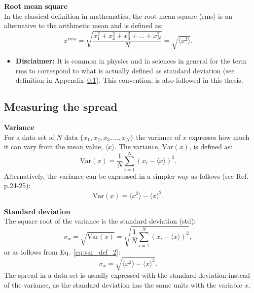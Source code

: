 \normalsize{\textbf{Root mean square}}\\
In the classical definition in mathematics, the root mean square (rms) is an alternative to the arithmetic mean and is defined as:
\begin{equation}\label{eq:rms_def}
    x^{rms} = \sqrt{\frac{x_1^2+x_2^2+x_3^2+...+x_N^2}{N}}=\sqrt{\langle x^2 \rangle}.
\end{equation}
\begin{itemize}
\item \textbf{Disclaimer:} It is common in physics and in sciences in general for the term rms to correspond to what is actually defined as standard deviation (see definition in Appendix~\ref{app:meas_spread}). This convention, is also followed in this thesis.
\end{itemize}
\subsection{Measuring the spread}\label{app:meas_spread}
\normalsize{\textbf{Variance}}\\
For a data set of $N$ data $\{ x_1, x_2, x_3, ..., x_N \}$ the variance of $x$  expresses how much it can vary from the mean value, $\langle x \rangle$. The variance, $\mathrm{Var}(x)$, is defined as:
\begin{equation}\label{eq:var_def_1}
    \mathrm{Var}(x) = \frac{1}{N} \sum_{i=1}^{N} (x_i-\langle x \rangle)^2.
\end{equation}
Alternatively, the variance can be expressed in a simpler way as follows (see Ref.~\cite{lvp.b313005720130101} p.24-25):
\begin{equation}\label{eq:var_def_2}
    \mathrm{Var}(x) = \langle x^2 \rangle - \langle x \rangle^2.
\end{equation}

\normalsize{\textbf{Standard deviation}}\\
The square root of the variance is the standard deviation (std):
\begin{equation}\label{eq:std_def_1}
    \sigma_x = \sqrt{\mathrm{Var}(x)} = \sqrt{\frac{1}{N} \sum_{i=1}^{N} (x_i-\langle x \rangle)^2},
\end{equation}
or as follows from Eq.~\eqref{eq:var_def_2}:
\begin{equation}\label{eq:std_def_2}
    \sigma_x = \sqrt{\langle x^2 \rangle - \langle x \rangle^2}.
\end{equation}
The spread in a data set is usually expressed with the standard deviation instead of the variance, as the standard deviation has the same units with the variable $x$.

